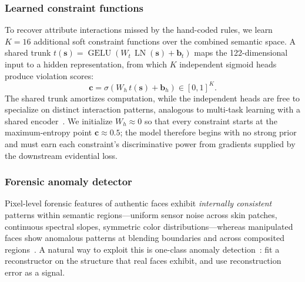 \documentclass{article}
\begin{document}
\subsubsection{Learned constraint functions}
\label{sec:lcf}

To recover attribute interactions missed by the hand-coded rules, we learn $K{=}16$ additional soft constraint functions over the combined semantic space. A shared trunk $t(\bm{s}) = \operatorname{GELU}(W_t\,\operatorname{LN}(\bm{s}) + \bm{b}_t)$ maps the 122-dimensional input to a hidden representation, from which $K$ independent sigmoid heads produce violation scores:
\begin{equation}
  \bm{c} = \sigma(W_h\, t(\bm{s}) + \bm{b}_h) \in [0, 1]^K.
  \label{eq:learned_constraints}
\end{equation}
The shared trunk amortizes computation, while the independent heads are free to specialize on distinct interaction patterns, analogous to multi-task learning with a shared encoder~\citep{caruana1997multitask}. We initialize $W_h \approx 0$ so that every constraint starts at the maximum-entropy point $\bm{c} \approx 0.5$; the model therefore begins with no strong prior and must earn each constraint's discriminative power from gradients supplied by the downstream evidential loss.


\subsubsection{Forensic anomaly detector}
\label{sec:fad}

Pixel-level forensic features of authentic faces exhibit \emph{internally consistent} patterns within semantic regions---uniform sensor noise across skin patches, continuous spectral slopes, symmetric color distributions---whereas manipulated faces show anomalous patterns at blending boundaries and across composited regions~\citep{fridrich2012rich,qian2020thinking,luo2021generalizing}. A natural way to exploit this is one-class anomaly detection~\citep{an2015variational,zong2018deep}: fit a reconstructor on the structure that real faces exhibit, and use reconstruction error as a signal.
\end{document}
